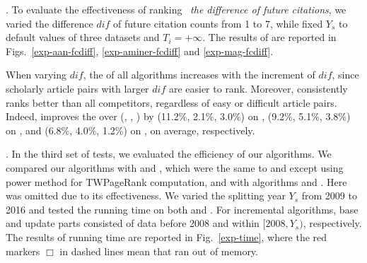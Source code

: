 .
To evaluate the effectiveness of ranking \wrt\ {\em the difference of future citations},
we varied the difference $dif$ of future citation counts from 1 to 7, while fixed $Y_s$ to default values of three datasets and $T_i=+\infty$. The results of \PairAcc are reported in Figs.~\ref{exp-aan-fcdiff}, \ref{exp-aminer-fcdiff} and \ref{exp-mag-fcdiff}.

When varying $dif$, the \PairAcc of all algorithms increases with the increment of $dif$, since scholarly article pairs with larger $dif$ are easier to rank. Moreover, \ensemblerank consistently ranks better than all competitors, regardless of easy or difficult article pairs. Indeed, \ensemblerank improves the \PairAcc over (\pagerank, \futurerank, \hhgrank) by (11.2\%, 2.1\%, 3.0\%) on \aan, (9.2\%, 5.1\%, 3.8\%) on \aminer, and (6.8\%, 4.0\%, 1.2\%) on \magdata, on average, respectively.



.
In the third set of tests, we evaluated the efficiency of our algorithms.
%
We compared our algorithms with \powtwprscc and \powensemble, which were the same to \twprscc and \batensemble except using power method for TWPageRank computation, and with algorithms \futurerank and \hhgrank.
Here \pagerank was omitted due to its effectiveness.
%
We varied the splitting year $Y_s$ from 2009 to 2016 and tested the running time on both \aminer and \magdata.
%
For incremental algorithms, base and update parts consisted of data before 2008 and within $[2008, Y_s)$, respectively.
%
The results of running time are reported in Fig.~\ref{exp-time}, where the red markers $\Box$ in dashed lines mean that \hhgrank ran out of memory.

